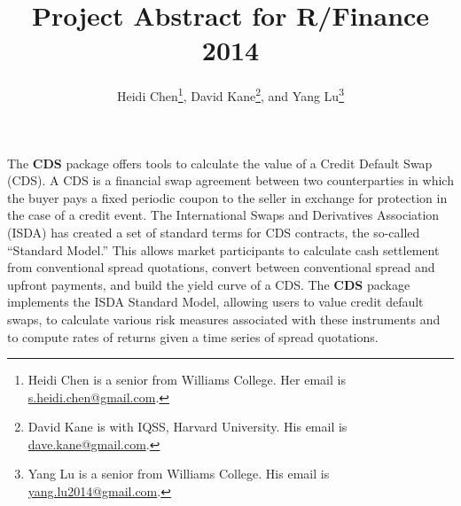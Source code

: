 \documentclass[12pt]{article}
\title{Project Abstract for R/Finance 2014}
\author{Heidi Chen\thanks{Heidi Chen is a senior from Williams College. Her email is \href{mailto:s.heidi.chen@gmail.com}{s.heidi.chen@gmail.com}.},
  David Kane\thanks{David Kane is with IQSS, Harvard University. His email is \href{mailto:dave.kane@gmail.com}{dave.kane@gmail.com}.}, and Yang Lu\thanks{Yang Lu is a senior from Williams College. His email is \href{mailto:yang.lu2014@gmail.com}{yang.lu2014@gmail.com}.}}
\theoremstyle{plain}
\begin{document}
\vspace*{-3cm}
 {\let\newpage\relax\maketitle}


The \textbf{CDS} package offers tools to calculate the value of a
Credit Default Swap (CDS). A CDS is a financial swap agreement
between two counterparties in which the buyer pays a fixed periodic
coupon to the seller in exchange for protection in the case of a
credit event. The International Swaps and Derivatives Association
(ISDA) has created a set of standard terms for CDS
contracts, the so-called ``Standard Model.'' This allows market 
participants to calculate cash settlement from
conventional spread quotations, convert between conventional spread and upfront
payments, and build the yield curve of a CDS. The \textbf{CDS} package
implements the ISDA Standard Model, allowing users to value credit default swaps, 
to calculate various risk measures associated with these instruments and to compute 
rates of returns given a time series of spread quotations.
\end{document}

